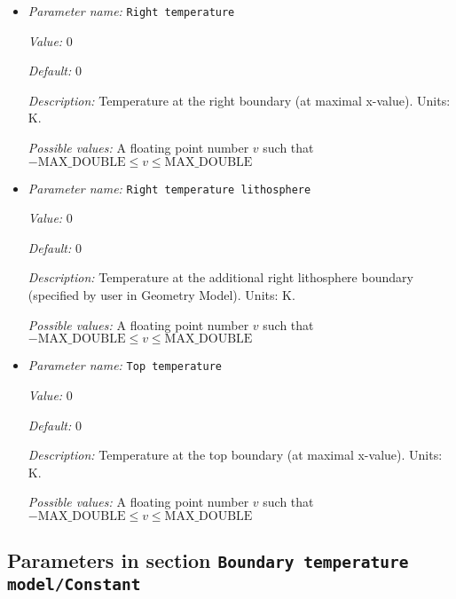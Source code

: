 \begin{itemize}
{\it Possible values:} A floating point number $v$ such that $-\text{MAX\_DOUBLE} \leq v \leq \text{MAX\_DOUBLE}$
\item {\it Parameter name:} {\tt Right temperature}
\label{parameters:Boundary temperature model/Box with lithosphere boundary indicators/Right temperature}


{\it Value:} 0


{\it Default:} 0


{\it Description:} Temperature at the right boundary (at maximal x-value). Units: K.


{\it Possible values:} A floating point number $v$ such that $-\text{MAX\_DOUBLE} \leq v \leq \text{MAX\_DOUBLE}$
\item {\it Parameter name:} {\tt Right temperature lithosphere}
\label{parameters:Boundary temperature model/Box with lithosphere boundary indicators/Right temperature lithosphere}


{\it Value:} 0


{\it Default:} 0


{\it Description:} Temperature at the additional right lithosphere boundary (specified by user in Geometry Model). Units: K.


{\it Possible values:} A floating point number $v$ such that $-\text{MAX\_DOUBLE} \leq v \leq \text{MAX\_DOUBLE}$
\item {\it Parameter name:} {\tt Top temperature}
\label{parameters:Boundary temperature model/Box with lithosphere boundary indicators/Top temperature}


{\it Value:} 0


{\it Default:} 0


{\it Description:} Temperature at the top boundary (at maximal x-value). Units: K.


{\it Possible values:} A floating point number $v$ such that $-\text{MAX\_DOUBLE} \leq v \leq \text{MAX\_DOUBLE}$
\end{itemize}

\subsection{Parameters in section \tt Boundary temperature model/Constant}
\label{parameters:Boundary_20temperature_20model/Constant}

